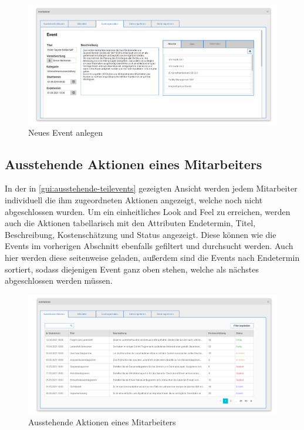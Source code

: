 \begin{figure}[ht!]
    \centering
    \includegraphics[width=0.98\columnwidth]{Bilder/mockup_neues_event_anlegen_attribute_setzen.png}
    \caption{Neues Event anlegen}
    \label{gui:event-anlegen}
\end{figure}

\newpage
\FloatBarrier
\subsection{Ausstehende Aktionen eines Mitarbeiters}
In der in \autoref{gui:ausstehende-teilevents} gezeigten Ansicht werden jedem Mitarbeiter individuell die ihm zugeordneten Aktionen angezeigt, welche noch nicht abgeschlossen wurden. Um ein einheitliches Look and Feel zu erreichen, werden auch die Aktionen tabellarisch mit den Attributen Endetermin, Titel, Beschreibung, Kostenschätzung und Status angezeigt. Diese können wie die Events im vorherigen Abschnitt ebenfalls gefiltert und durchsucht werden. Auch hier werden diese seitenweise geladen, außerdem sind die Events nach Endetermin sortiert, sodass diejenigen Event ganz oben stehen, welche als nächstes abgeschlossen werden müssen.

\begin{figure}[ht!]
    \centering
    \includegraphics[width=0.98\columnwidth]{Bilder/mockup_ausstehende_teilevents.png}
    \caption{Ausstehende Aktionen eines Mitarbeiters}
    \label{gui:ausstehende-teilevents}
\end{figure}

